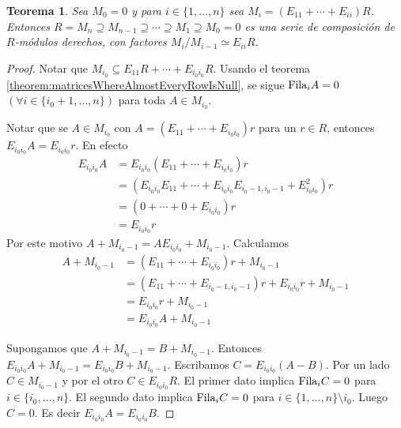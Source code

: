 \documentclass{report}
\newcommand{\Fila}{\textnormal{Fila}}
\newtheorem{theorem}{Teorema}
\begin{document}
  \begin{theorem}
    \label{theorem:compositionSeriesOfRightModulesForMatrixRing}
    Sea \(M_0 = 0\) y para \(i \in \{1, \dots, n\}\) sea \(M_i = (E_{1 1} + \cdots + E_{i i}) R\).
    Entonces \(R = M_n \supseteq M_{n - 1} \supseteq \cdots \supseteq M_1 \supseteq M_0 = 0\) es una serie de composición de \(R\)-módulos derechos, con factores \(M_i / M_{i - 1} \simeq E_{i i} R\).
  \end{theorem}
  \begin{proof}
    Notar que \(M_{i_0} \subseteq E_{1 1} R + \cdots + E_{i_0 i_0} R\).
    Usando el teorema \ref{theorem:matricesWhereAlmostEveryRowIsNull}, se sigue \(\Fila_i A = 0\) \((\forall i \in \{i_0 + 1, \dots, n\})\) para toda \(A \in M_{i_0}\).

    Notar que se \(A \in M_{i_0}\) con \(A = (E_{1 1} + \cdots + E_{i_0 i_0}) r\) para un \(r \in R\), entonces \(E_{i_0 i_0} A = E_{i_0 i_0} r\).
    En efecto
    \begin{align}
      E_{i_0 i_0} A
      &=
      E_{i_0 i_0} (E_{1 1} + \cdots + E_{i_0 i_0}) r
      \\
      &=
      (E_{i_0 i_0} E_{1 1} + \cdots + E_{i_0 i_0} E_{i_0 - 1, i_0 - 1} + E_{i_0 i_0}^2) r
      \\
      &=
      (0 + \cdots + 0 + E_{i_0 i_0}) r
      \\
      &=
      E_{i_0 i_0} r
    \end{align}
    Por este motivo \(A + M_{i_0 - 1} = A E_{i_0 i_0} + M_{i_0 - 1}\).
    Calculamos
    \begin{align}
      A + M_{i_0 - 1}
      &=
      (E_{1 1} + \cdots + E_{i_0 i_0}) r + M_{i_0 - 1}
      \\
      &=
      (E_{1 1} + \cdots + E_{i_0 - 1, i_0 - 1}) r + E_{i_0 i_0} r + M_{i_0 - 1}
      \\
      &=
      E_{i_0 i_0} r + M_{i_0 - 1}
      \\
      &=
      E_{i_0 i_0} A + M_{i_0 - 1}
    \end{align}

    Supongamos que \(A + M_{i_0 - 1} = B + M_{i_0 -1}\).
    Entonces \(E_{i_0 i_0} A + M_{i_0 - 1} = E_{i_0 i_0} B + M_{i_0 - 1}\).
    Escribamos \(C = E_{i_0 i_0} (A - B)\).
    Por un lado \(C \in M_{i_0 - 1}\) y por el otro \(C \in E_{i_0 i_0} R\).
    El primer dato implica \(\Fila_i C = 0\) para \(i \in \{i_0, \dots, n\}\).
    El segundo dato implica \(\Fila_i C = 0\) para \(i \in \{1, \dots, n\} \setminus i_0\).
    Luego \(C = 0\).
    Es decir \(E_{i_0 i_0} A = E_{i_0 i_0} B\).


\end{proof}
\end{document}
